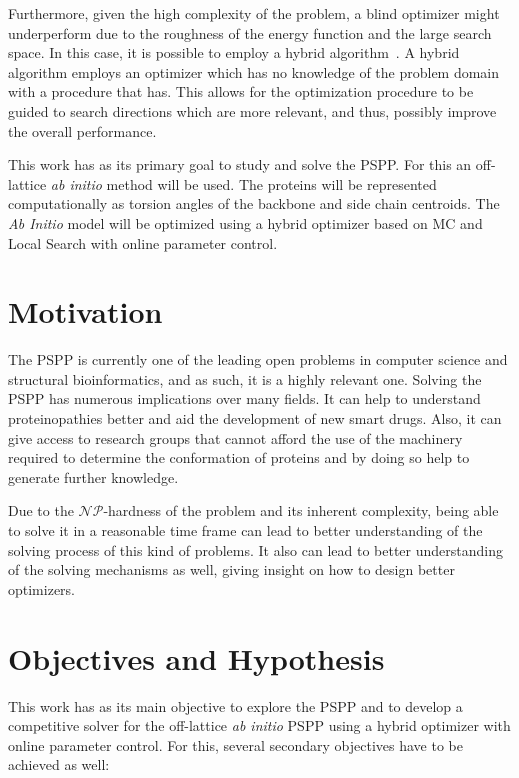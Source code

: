 Furthermore, given the high complexity of the problem, a blind optimizer might
underperform due to the roughness of the energy function and the large
search space. In this case, it is possible to employ a hybrid
algorithm~\cite{blum2011hybrid}. A hybrid algorithm employs an optimizer which has no
knowledge of the problem domain with a procedure that has. This allows for the
optimization procedure to be guided to search directions which are more
relevant, and thus, possibly improve the overall performance.

This work has as its primary goal to study and solve the \ac{PSPP}. For this an
off-lattice \textit{ab initio} method will be used. The proteins will be
represented computationally as torsion angles of the backbone and side chain
centroids. The \textit{Ab Initio} model will be optimized using a hybrid
optimizer based on \ac{MC} and Local Search with online parameter control.


\section{Motivation}\label{sec:chap1_motivation}

The \ac{PSPP} is currently one of the leading open problems in computer science and
structural bioinformatics, and as such, it is a highly relevant one. Solving
the \ac{PSPP} has numerous implications over many fields. It can help to understand
proteinopathies better and aid the development of new smart drugs.
Also, it can give access to research groups that cannot afford the use of the
machinery required to determine the conformation of proteins and by doing so
help to generate further knowledge.

Due to the $\mathcal{NP}$-hardness of the problem and its inherent complexity,
being able to solve it in a reasonable time frame can lead to better
understanding of the solving process of this kind of problems. It also can lead
to better understanding of the solving mechanisms as well, giving insight on
how to design better optimizers.

\section{Objectives and Hypothesis}\label{sec:chap1_objectives}

This work has as its main objective to explore the \ac{PSPP} and to develop a
competitive solver for the off-lattice \textit{ab initio} \ac{PSPP} using a
hybrid optimizer with online parameter control. For this, several secondary
objectives have to be achieved as well:

